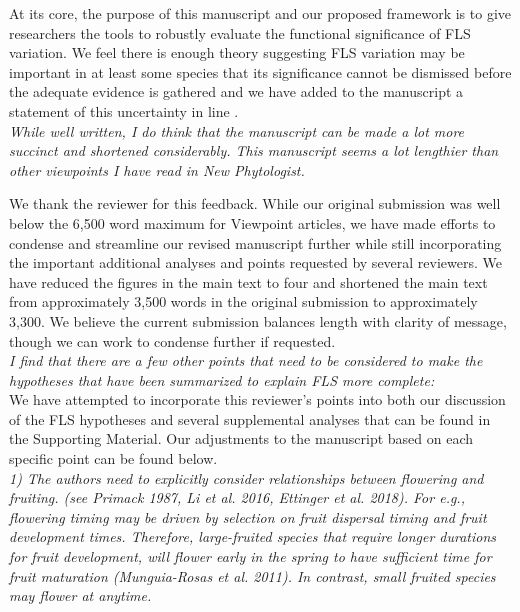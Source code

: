 \documentclass{article}[11pt]
\begin{document}
At its core, the purpose of this manuscript and our proposed framework is to give researchers the tools to robustly evaluate the functional significance of FLS variation. We feel there is enough theory suggesting FLS variation may be important in at least some species that its significance cannot be dismissed before the adequate evidence is gathered and we have added to the manuscript a statement of this uncertainty in line . \\

\emph{While well written, I do think that the manuscript can be made a lot more succinct and shortened considerably. This manuscript seems a lot lengthier than other viewpoints I have read in New Phytologist.}

\noindent We thank the reviewer for this feedback. While our original submission was well below the 6,500 word maximum for Viewpoint articles, we have made efforts to condense and streamline our revised manuscript further while still incorporating the important additional analyses and points requested by several reviewers. We have reduced the figures in the main text to four and shortened the main text from approximately 3,500 words in the original submission to approximately 3,300. We believe the current submission balances length with clarity of message, though we can work to condense further if requested.\\

\emph{I find that there are a few other points that need to be considered to make the hypotheses that have been summarized to explain FLS more complete:}\\

\noindent We have attempted to incorporate this reviewer's points into both our discussion of the FLS hypotheses and several supplemental analyses that can be found in the Supporting Material. Our adjustments to the manuscript based on each specific point can be found below.\\

\emph{1) The authors need to explicitly consider relationships between flowering and fruiting. (see Primack 1987, Li et al. 2016, Ettinger et al. 2018). For e.g., flowering timing may be driven by selection on fruit dispersal timing and fruit development times. Therefore, large-fruited species that require longer durations for fruit development, will flower early in the spring to have sufficient time for fruit maturation (Munguia-Rosas et al. 2011). In contrast, small fruited species may flower at anytime.}\\
\end{document}
